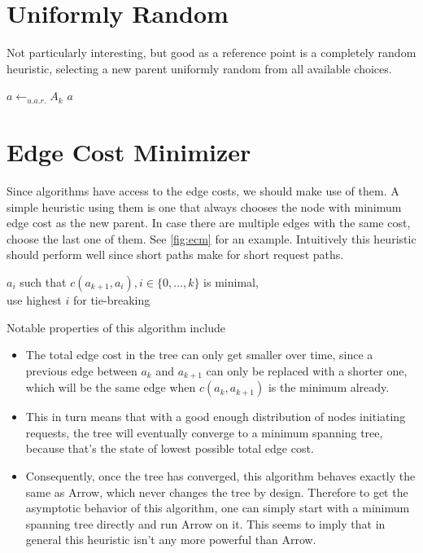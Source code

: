 \documentclass[a4paper, oneside]{discothesis}
\begin{document}
\section{Uniformly Random}

Not particularly interesting, but good as a reference point is a completely random heuristic, selecting a new parent uniformly random from all available choices.

\begin{algorithmic}
\State$a\gets_{u.a.r.}A_k$
\State\Return $a$
\EndFunction
\end{algorithmic}

\section{Edge Cost Minimizer}
\label{alg:ecm}

Since algorithms have access to the edge costs, we should make use of them. A simple heuristic using them is one that always chooses the node with minimum edge cost as the new parent. In case there are multiple edges with the same cost, choose the last one of them. See \autoref{fig:ecm} for an example. Intuitively this heuristic should perform well since short paths make for short request paths.
\begin{algorithmic}
\State\Return$a_i$ such that $c(a_{k+1},a_{i}),i\in\{0,\dots,k\}$ is minimal, \\\qquad use highest $i$ for tie-breaking
\EndFunction
\end{algorithmic}

\newpage
Notable properties of this algorithm include
\begin{itemize}
\item The total edge cost in the tree can only get smaller over time, since a previous edge between $a_k$ and $a_{k+1}$ can only be replaced with a shorter one, which will be the same edge when $c(a_k,a_{k+1})$ is the minimum already.
\item This in turn means that with a good enough distribution of nodes initiating requests, the tree will eventually converge to a minimum spanning tree, because that's the state of lowest possible total edge cost.
\item Consequently, once the tree has converged, this algorithm behaves exactly the same as Arrow, which never changes the tree by design. Therefore to get the asymptotic behavior of this algorithm, one can simply start with a minimum spanning tree directly and run Arrow on it. This seems to imply that in general this heuristic isn't any more powerful than Arrow.
\end{itemize}
\end{document}
